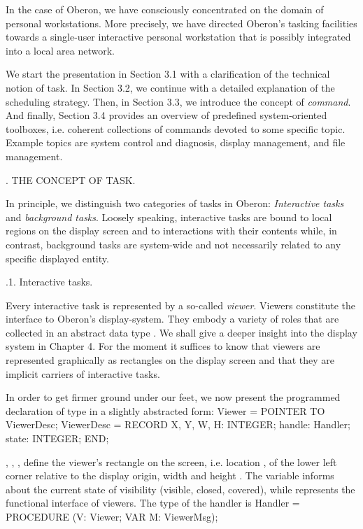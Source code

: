 In the case of Oberon, we have consciously concentrated on the domain
of personal workstations. More precisely, we have directed Oberon's
tasking facilities towards a single-user interactive personal
workstation that is possibly integrated into a local area network.

We start the presentation in Section 3.1 with a clarification of the
technical notion of task. In Section 3.2, we continue with a detailed
explanation of the scheduling strategy. Then, in Section 3.3, we
introduce the concept of \emph{command}. And finally, Section 3.4 provides an
overview of predefined system-oriented toolboxes, i.e. coherent
collections of commands devoted to some specific topic. Example topics
are system control and diagnosis, display management, and file
management.

. THE CONCEPT OF TASK.

In principle, we distinguish two categories of tasks in Oberon: \emph{Interactive tasks} and \emph{background tasks}. Loosely speaking,
interactive tasks are bound to local regions on the display screen and
to interactions with their contents while, in contrast, background
tasks are system-wide and not necessarily related to any specific
displayed entity.

.1. Interactive tasks.

Every interactive task is represented by a so-called \emph{viewer}. Viewers
constitute the interface to Oberon's display-system. They embody a
variety of roles that are collected in an abstract data type
. We shall give a deeper insight into the display system in
Chapter 4. For the moment it suffices to know that viewers are
represented graphically as rectangles on the display screen and that
they are implicit carriers of interactive tasks. 


In order to get firmer ground under our feet, we now present the programmed declaration of type  in a slightly abstracted form:
\begintt
Viewer = POINTER TO ViewerDesc;
ViewerDesc = RECORD
  X, Y, W, H: INTEGER;
  handle: Handler;
  state: INTEGER;
END;
\endtt

\noindent {}, , ,  define the viewer's rectangle on the screen, i.e. location
,  of the lower left corner relative to the display origin, width 
and height . The variable  informs about the current state of
visibility (visible, closed, covered), while  represents the
functional interface of viewers. The type of the handler is
\begintt
Handler = PROCEDURE (V: Viewer; VAR M: ViewerMsg);
\endtt

